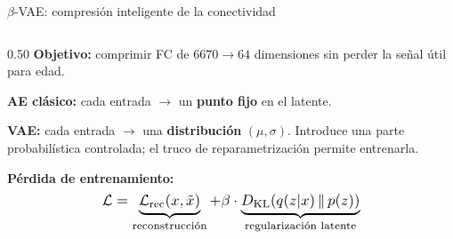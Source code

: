 \documentclass[aspectratio=169, 11pt]{beamer}
\newcommand{\highlight}[1]{\textcolor{uncaccent}{\textbf{#1}}}
\begin{document}
\begin{frame}[shrink=10]{$\beta$-VAE: compresión inteligente de la conectividad}
  \begin{columns}[T]
    \begin{column}{0.50\textwidth}
      {\small \textbf{Objetivo:} comprimir FC de $6670 \to 64$ dimensiones sin perder la señal útil para edad.}

      \vspace{0.12cm}
      {\small \textbf{AE clásico:} cada entrada $\to$ un \textbf{punto fijo} en el latente.}

      \vspace{0.12cm}
      {\small \textbf{VAE:} cada entrada $\to$ una \highlight{distribución} $(\mu, \sigma)$. Introduce una parte probabilística controlada; el truco de reparametrización permite entrenarla.}

      \vspace{0.1cm}
      {\footnotesize \textbf{Pérdida de entrenamiento:}}
      \vspace{-0.12cm}
      \[
      \resizebox{0.6\linewidth}{!}{$
      \mathcal{L} =
      \underbrace{\mathcal{L}_{\mathrm{rec}}(x,\tilde{x})}_{\text{\scriptsize reconstrucción}}
      + \beta \cdot
      \underbrace{D_{\mathrm{KL}}(q(z|x)\,\|\,p(z))}_{\text{\scriptsize regularización latente}}
      $}
      \]
      \vspace{-0.18cm}


\end{column}
\end{columns}
\end{frame}
\end{document}
